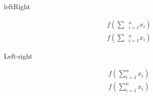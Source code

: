 \copyrightVincent

\begin{saveblock}{leftRight}
	\begin{highlightblock}[gobble=8,linewidth=\textwidth,framexleftmargin=0.25em]
		\begin{align*}
			&f(\sum~~_{i=1}^{n}x_i)\\
			&f\left(\sum~~_{i=1}^{n}x_i\right)
		\end{align*}
	\end{highlightblock}
\end{saveblock}

\begin{frame}{Left-right}

	\begin{align*}
		&f(\sum_{i=1}^{n}x_i)\\
		&f\left(\sum_{i=1}^{n}x_i\right)\\
	\end{align*}
\end{frame}



